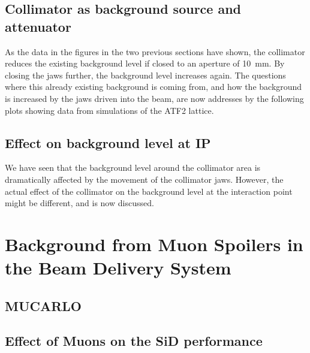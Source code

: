\subsection{Collimator as background source and attenuator}
\label{sec:BDSIM_sim}
As the data in the figures in the two previous sections have shown, the collimator reduces the existing background level if closed to an aperture of \SI{10}{\milli\metre}. By closing the jaws further, the background level increases again. The questions where this already existing background is coming from, and how the background is increased by the jaws driven into the beam, are now addresses by the following plots showing data from \bdsim simulations of the ATF2 lattice.

\subsection{Effect on background level at IP}
\label{collimator_bkg_IP}
We have seen that the background level around the collimator area is dramatically affected by the movement of the collimator jaws. However, the actual effect of the collimator on the background level at the interaction point might be different, and is now discussed.

\section{Background from Muon Spoilers in the Beam Delivery System}
\subsection{MUCARLO}
\subsection{Effect of Muons on the SiD performance}